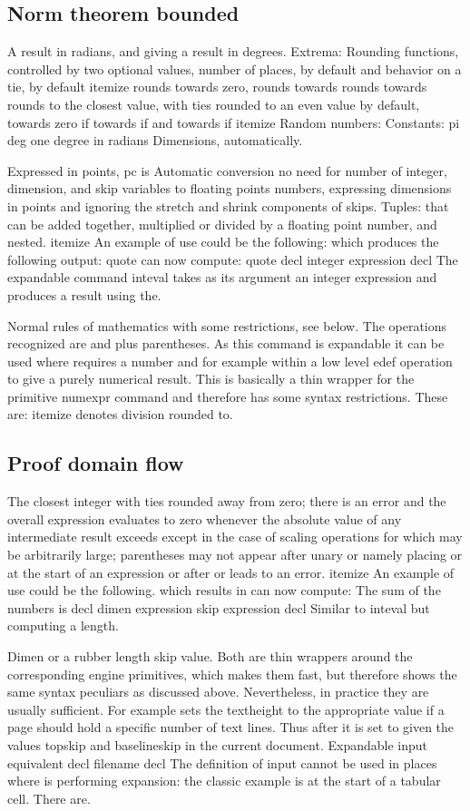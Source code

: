\documentclass{article}
\begin{document}
\subsection{Norm theorem bounded}
A result in radians, and giving a result in degrees. Extrema: Rounding functions, controlled by two optional values, number of places, by default and behavior on a tie, by default itemize rounds towards zero, rounds towards rounds towards rounds to the closest value, with ties rounded to an even value by default, towards zero if towards if and towards if itemize Random numbers: Constants: pi deg one degree in radians Dimensions, automatically.

Expressed in points, pc is Automatic conversion no need for number of integer, dimension, and skip variables to floating points numbers, expressing dimensions in points and ignoring the stretch and shrink components of skips. Tuples: that can be added together, multiplied or divided by a floating point number, and nested. itemize An example of use could be the following: which produces the following output: quote can now compute: quote decl integer expression decl The expandable command inteval takes as its argument an integer expression and produces a result using the.

Normal rules of mathematics with some restrictions, see below. The operations recognized are and plus parentheses. As this command is expandable it can be used where requires a number and for example within a low level edef operation to give a purely numerical result. This is basically a thin wrapper for the primitive numexpr command and therefore has some syntax restrictions. These are: itemize denotes division rounded to.

\subsection{Proof domain flow}
The closest integer with ties rounded away from zero; there is an error and the overall expression evaluates to zero whenever the absolute value of any intermediate result exceeds except in the case of scaling operations for which may be arbitrarily large; parentheses may not appear after unary or namely placing or at the start of an expression or after or leads to an error. itemize An example of use could be the following. which results in can now compute: The sum of the numbers is decl dimen expression skip expression decl Similar to inteval but computing a length.

Dimen or a rubber length skip value. Both are thin wrappers around the corresponding engine primitives, which makes them fast, but therefore shows the same syntax peculiars as discussed above. Nevertheless, in practice they are usually sufficient. For example sets the textheight to the appropriate value if a page should hold a specific number of text lines. Thus after it is set to given the values topskip and baselineskip in the current document. Expandable input equivalent decl filename decl The definition of input cannot be used in places where is performing expansion: the classic example is at the start of a tabular cell. There are.
\end{document}
